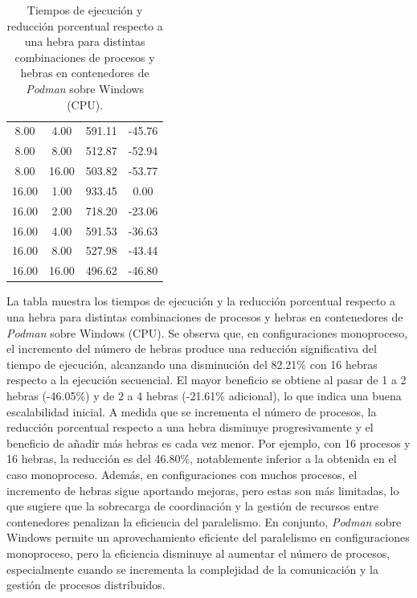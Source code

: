 \begin{table}[ht]
\begin{tabular}{|c|c|c|c|}
        8.00              & 4.00            & 591.11              & -45.76                         \\
        8.00              & 8.00            & 512.87              & -52.94                         \\
        8.00              & 16.00           & 503.82              & -53.77                         \\
        16.00             & 1.00            & 933.45              & 0.00                           \\
        16.00             & 2.00            & 718.20              & -23.06                         \\
        16.00             & 4.00            & 591.53              & -36.63                         \\
        16.00             & 8.00            & 527.98              & -43.44                         \\
        16.00             & 16.00           & 496.62              & -46.80                         \\
        \hline
    \end{tabular}
    \caption{Tiempos de ejecución y reducción porcentual respecto a una hebra para distintas combinaciones de procesos y hebras en contenedores de \textit{Podman} sobre Windows (CPU).}
    \label{tab:thread_sweep_windows_podman_time}
\end{table}

La tabla muestra los tiempos de ejecución y la reducción porcentual respecto a una hebra para distintas combinaciones de procesos y hebras en contenedores de \textit{Podman} sobre Windows (CPU). Se observa que, en configuraciones monoproceso, el incremento del número de hebras produce una reducción significativa del tiempo de ejecución, alcanzando una disminución del 82.21\% con 16 hebras respecto a la ejecución secuencial. El mayor beneficio se obtiene al pasar de 1 a 2 hebras (-46.05\%) y de 2 a 4 hebras (-21.61\% adicional), lo que indica una buena escalabilidad inicial. A medida que se incrementa el número de procesos, la reducción porcentual respecto a una hebra disminuye progresivamente y el beneficio de añadir más hebras es cada vez menor. Por ejemplo, con 16 procesos y 16 hebras, la reducción es del 46.80\%, notablemente inferior a la obtenida en el caso monoproceso. Además, en configuraciones con muchos procesos, el incremento de hebras sigue aportando mejoras, pero estas son más limitadas, lo que sugiere que la sobrecarga de coordinación y la gestión de recursos entre contenedores penalizan la eficiencia del paralelismo. En conjunto, \textit{Podman} sobre Windows permite un aprovechamiento eficiente del paralelismo en configuraciones monoproceso, pero la eficiencia disminuye al aumentar el número de procesos, especialmente cuando se incrementa la complejidad de la comunicación y la gestión de procesos distribuidos.


